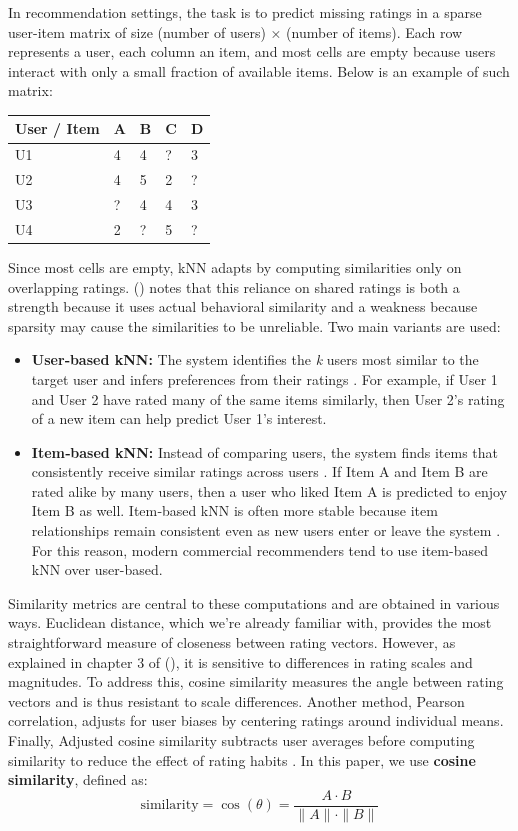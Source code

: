 \documentclass[
  12pt]{article}
\providecommand{\tightlist}{%
  \setlength{\itemsep}{0pt}\setlength{\parskip}{0pt}}
\begin{document}
In recommendation settings, the task is to predict missing ratings in a
sparse user-item matrix of size (number of users) × (number of items).
Each row represents a user, each column an item, and most cells are
empty because users interact with only a small fraction of available
items. Below is an example of such matrix:

\begin{longtable}[]{@{}lllll@{}}
\toprule\noalign{}
User / Item & A & B & C & D \\
\midrule\noalign{}
\endhead
\bottomrule\noalign{}
\endlastfoot
U1 & 4 & 4 & ? & 3 \\
U2 & 4 & 5 & 2 & ? \\
U3 & ? & 4 & 4 & 3 \\
U4 & 2 & ? & 5 & ? \\
\end{longtable}

Since most cells are empty, kNN adapts by computing similarities only on
overlapping ratings. (\citet{kramer2013}) notes that this reliance on
shared ratings is both a strength because it uses actual behavioral
similarity and a weakness because sparsity may cause the similarities to
be unreliable. Two main variants are used:

\begin{itemize}
\tightlist
\item
  \textbf{User‑based kNN:} The system identifies the \emph{k} users most
  similar to the target user and infers preferences from their ratings
  \citep{nikolakopoulos2021}. For example, if User 1 and User 2 have
  rated many of the same items similarly, then User 2's rating of a new
  item can help predict User 1's interest.
\item
  \textbf{Item‑based kNN:} Instead of comparing users, the system finds
  items that consistently receive similar ratings across users
  \citep{nikolakopoulos2021}. If Item A and Item B are rated alike by
  many users, then a user who liked Item A is predicted to enjoy Item B
  as well. Item‑based kNN is often more stable because item
  relationships remain consistent even as new users enter or leave the
  system \citep{ricci2022}. For this reason, modern commercial
  recommenders tend to use item-based kNN over user-based.
\end{itemize}

Similarity metrics are central to these computations and are obtained in
various ways. Euclidean distance, which we're already familiar with,
provides the most straightforward measure of closeness between rating
vectors. However, as explained in chapter 3 of (\citet{apxml2025}), it
is sensitive to differences in rating scales and magnitudes. To address
this, cosine similarity measures the angle between rating vectors and is
thus resistant to scale differences. Another method, Pearson
correlation, adjusts for user biases by centering ratings around
individual means. Finally, Adjusted cosine similarity subtracts user
averages before computing similarity to reduce the effect of rating
habits \citep{aggarwal2016}. In this paper, we use \textbf{cosine
similarity}, defined as: \[
\text{similarity} = \cos(\theta) = \frac{A \cdot B}{\|A\| \cdot \|B\|}
\]
\end{document}
